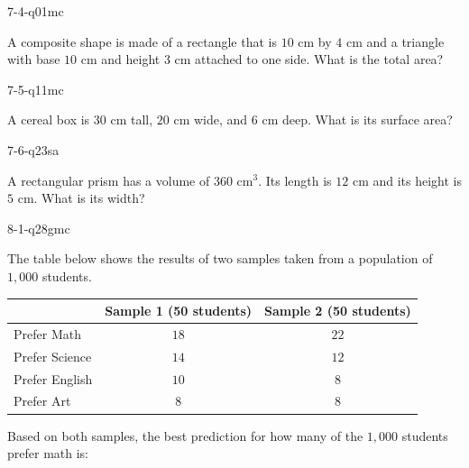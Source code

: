 \begin{practiceQuestion}{7-4-q01}{mc}
\begin{questionText}
A composite shape is made of a rectangle that is $10$ cm by $4$ cm and a triangle with base $10$ cm and height $3$ cm attached to one side. What is the total area?
\end{questionText}
\end{practiceQuestion}

\begin{practiceQuestion}{7-5-q11}{mc}
\begin{questionText}
A cereal box is $30$ cm tall, $20$ cm wide, and $6$ cm deep. What is its surface area?
\end{questionText}
\end{practiceQuestion}

\begin{practiceQuestion}{7-6-q23}{sa}
\begin{questionText}
A rectangular prism has a volume of $360$ cm$^3$. Its length is $12$ cm and its height is $5$ cm. What is its width?
\end{questionText}
\end{practiceQuestion}

\begin{practiceQuestion}{8-1-q28}{gmc}
\begin{questionText}
The table below shows the results of two samples taken from a population of $1{,}000$ students.

\begin{center}
\begin{tabular}{|l|c|c|}
\hline
 & \textbf{Sample 1 (50 students)} & \textbf{Sample 2 (50 students)} \\
\hline
Prefer Math & $18$ & $22$ \\
\hline
Prefer Science & $14$ & $12$ \\
\hline
Prefer English & $10$ & $8$ \\
\hline
Prefer Art & $8$ & $8$ \\
\hline
\end{tabular}
\end{center}

Based on both samples, the best prediction for how many of the $1{,}000$ students prefer math is:
\end{questionText}
\end{practiceQuestion}

